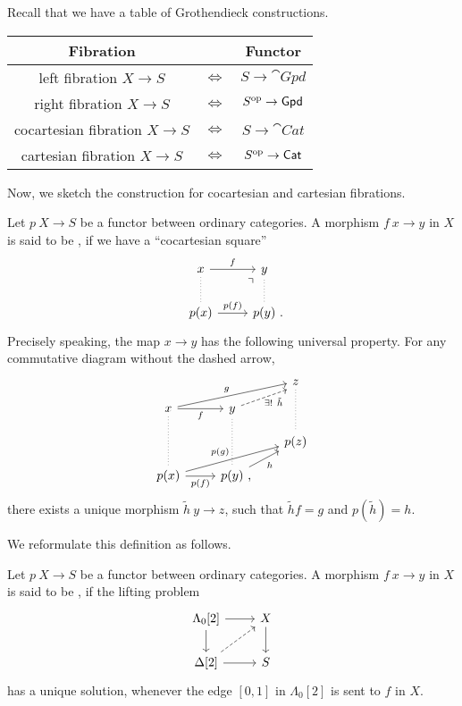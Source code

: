 Recall that we have a table of Grothendieck constructions.

\begin{center}
    \begin{tabular}{ccc}
        \textbf{Fibration} & & \textbf{Functor} \\ \hline
        left fibration $X\to S$ & $\Longleftrightarrow$ & $S\to\cat{Gpd}$ \\
        right fibration $X\to S$ & $\Longleftrightarrow$ & $S^{\mathrm{op}}\to\mathsf{Gpd}$ \\
        cocartesian fibration $X\to S$ & $\Longleftrightarrow$ & $S\to\cat{Cat}$ \\
        cartesian fibration $X\to S$ & $\Longleftrightarrow$ & $S^{\mathrm{op}}\to\mathsf{Cat}$ \\
    \end{tabular}
\end{center}

Now, we sketch the construction for cocartesian and cartesian fibrations.

Let $p\:X\to S$ be a functor between ordinary categories.
A morphism $f\:x\to y$ in $X$ is said to be ,
if we have a ``cocartesian square''
\[\begin{tikzcd}
    x\ar[d,dotted,dash]\ar[r,"f"] & y\ar[d,dotted,dash] \\
    p(x)\ar[r,"p(f)"]\ar[ur,phantom,end anchor=south west,very near end,"\urcorner"] & p(y)\rlap{\ .}
\end{tikzcd}\]
Precisely speaking, the map $x\to y$ has the following universal property.
For any commutative diagram without the dashed arrow,
\[\begin{tikzcd}[row sep=1em]
    && z\ar[dd,dotted,dash] \\
    x\ar[dd,dotted,dash]\ar[r,"f"']\ar[urr,"g"]
    & y\ar[dd,dotted,dash]\ar[ur,dashed,end anchor=south west,"\exists!\ \tilde h"' inner sep=0pt] \\
    && p(z) \\
    p(x)\ar[r,"p(f)"']\ar[urr,"p(g)"]
    & p(y)\rlap{\ ,} \ar[ur,"h"']
\end{tikzcd}\]
there exists a unique morphism $\tilde h\:y\to z$,
such that $\tilde hf=g$ and $p(\tilde h)=h$.

We reformulate this definition as follows.

\begin{definition}
    Let $p\:X\to S$ be a functor between ordinary categories.
    A morphism $f\:x\to y$ in $X$ is said to be ,
    if the lifting problem 
    \[\begin{tikzcd}
        \Lambda_0[2] \ar[d] \ar[r] & X \ar[d] \\
        \Delta[2] \ar[r] \ar[ur,dashed] & S
    \end{tikzcd}\]
    has a unique solution, whenever the edge $[0,1]$ in $\Lambda_0[2]$ is sent to $f$ in $X$.
\end{definition}

